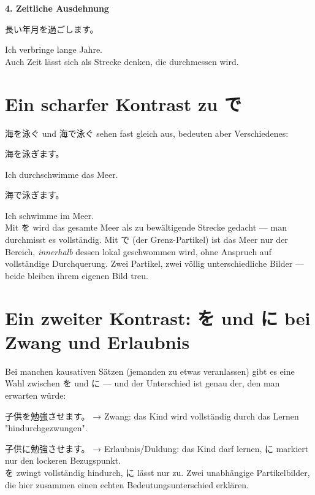 \documentclass[12pt]{book}
\begin{document}
\textbf{4. Zeitliche Ausdehnung}
\par\quad 長い年月を過ごします。\\
\par\quad Ich verbringe lange Jahre.\\

Auch Zeit lässt sich als Strecke denken, die durchmessen wird.

\section*{Ein scharfer Kontrast zu で}

海を泳ぐ und 海で泳ぐ sehen fast gleich aus, bedeuten aber Verschiedenes:

\par\quad 海を泳ぎます。\\
\par\quad Ich durchschwimme das Meer.\\

\par\quad 海で泳ぎます。\\
\par\quad Ich schwimme im Meer.\\

Mit を wird das gesamte Meer als zu bewältigende Strecke gedacht — man durchmisst es vollständig. Mit で (der Grenz-Partikel) ist das Meer nur der Bereich, \emph{innerhalb} dessen lokal geschwommen wird, ohne Anspruch auf vollständige Durchquerung. Zwei Partikel, zwei völlig unterschiedliche Bilder — beide bleiben ihrem eigenen Bild treu.

\section*{Ein zweiter Kontrast: を und に bei Zwang und Erlaubnis}

Bei manchen kausativen Sätzen (jemanden zu etwas veranlassen) gibt es eine Wahl zwischen を und に — und der Unterschied ist genau der, den man erwarten würde:

\par\quad 子供を勉強させます。 → Zwang: das Kind wird vollständig durch das Lernen "hindurchgezwungen".\\
\par\quad 子供に勉強させます。 → Erlaubnis/Duldung: das Kind darf lernen, に markiert nur den lockeren Bezugspunkt.\\

を zwingt vollständig hindurch, に lässt nur zu. Zwei unabhängige Partikelbilder, die hier zusammen einen echten Bedeutungsunterschied erklären.
\end{document}
